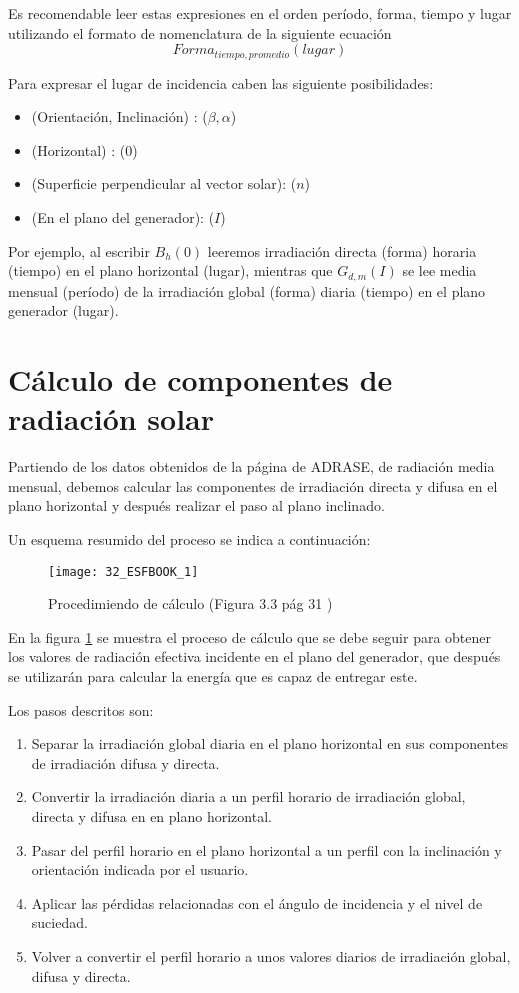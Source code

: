 Es recomendable leer estas expresiones en el orden período, forma, tiempo y lugar utilizando el formato de nomenclatura de la siguiente ecuación
\begin{equation}
	Forma_{tiempo, promedio}(lugar)
\end{equation}

Para expresar el lugar de incidencia caben las siguiente posibilidades:
\begin{itemize}
\item (Orientación, Inclinación) : ($\beta , \alpha$)
\item (Horizontal) : (0)
\item (Superficie perpendicular al vector solar): ($n$)
\item (En el plano del generador): ($I$)
\end{itemize}

Por ejemplo, al escribir $B_{h}(0)$ leeremos irradiación directa (forma) horaria (tiempo) en el plano horizontal (lugar), mientras que $G_{d,m}(I)$ se lee media mensual (período) de la irradiación global (forma) diaria (tiempo) en el plano generador (lugar).\\

\section{Cálculo de componentes de radiación solar}
Partiendo de los datos obtenidos de la página de ADRASE, de radiación media mensual, debemos calcular las componentes de irradiación directa y difusa en el plano horizontal y después realizar el paso al plano inclinado.

Un esquema resumido del proceso se indica a continuación:

\begin{figure}[ht]
\texttt{[image: 32\_ESFBOOK\_1]}
\centering
\caption{Procedimiendo de cálculo (Figura 3.3 pág 31 \cite{esf_book})}
\label{fig:fig_1}
\end{figure}

En la figura \ref{fig:fig_1} se muestra el proceso de cálculo que se debe seguir para obtener los valores de radiación efectiva incidente en el plano del generador, que después se utilizarán para calcular la energía que es capaz de entregar este.


Los pasos descritos son:
\begin{enumerate}
	\item Separar la irradiación global diaria en el plano horizontal en sus componentes de irradiación difusa y directa.
	\item Convertir la irradiación diaria a un perfil horario de irradiación global, directa y difusa en en plano horizontal.
	\item Pasar del perfil horario en el plano horizontal a un perfil con la inclinación y orientación indicada por el usuario.
	\item Aplicar las pérdidas relacionadas con el ángulo de incidencia y el nivel de suciedad.
	\item Volver a convertir el perfil horario a unos valores diarios de irradiación global, difusa y directa.
\end{enumerate}

